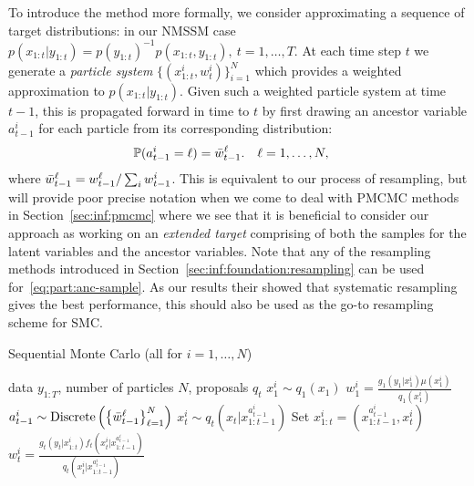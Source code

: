To introduce the \smc method more formally, we consider approximating a sequence of target distributions: in our NMSSM
 case $p(x_{1:t}|y_{1:t}) = p(y_{1:t})^{-1} p(x_{1:t},y_{1:t}), ~t=1,\ldots,T$. 
At each time step $t$ we 
generate a \emph{particle system}
$\{(x_{1:t}^i,w_{t}^i)\}_{i=1}^N$ which provides a weighted approximation  to $p(x_{1:t}|y_{1:t})$. Given such a weighted particle system at time $t-1$, this 
is propagated forward in time to $t$ by first drawing an ancestor variable $a_{t-1}^i$ for each particle from its corresponding distribution:
\begin{align}
\label{eq:part:anc-sample}
\mathbb{P}(a_{t-1}^i = \ell) &= \bar w_{t-1}^\ell.
&
\ell&=1,\ldots,N,
\end{align}
where $\bar w_{t-1}^\ell = w_{t-1}^\ell / \sum_i w_{t-1}^i$. This is equivalent to our process of resampling, but
will provide poor precise notation when we come to deal with PMCMC methods in Section~\ref{sec:inf:pmcmc}
where we see that it is beneficial to consider our approach as working on an \emph{extended target} comprising
of both the samples for the latent variables and the ancestor variables.  Note that any of the resampling 
methods introduced in Section~\ref{sec:inf:foundation:resampling} can be used for~\eqref{eq:part:anc-sample}.  As
our results their showed that systematic resampling gives the best performance, this should also be used
as the go-to resampling scheme for SMC.

\begin{algorithm}[tb]
	\caption{Sequential Monte Carlo \hfill {\small (all for $i=1,\ldots,N$)}}
	\label{alg:part:smc}
	\begin{spacing}{1.2}
		\begin{algorithmic}[1]
			\renewcommand{\algorithmicrequire}{\textbf{Inputs:}}
			\renewcommand{\algorithmicensure}{\textbf{Outputs:}}				 
			\Require  data $y_{1:T}$, number of particles $N$, proposals $q_t$
			\State $x_1^i \sim q_1(x_1)$
			\State $w_1^i = \frac{g_1(y_1|x_1^i) \mu(x_1^i)}{q_1(x_1^i)}$
			\State $a_{t-1}^i \sim \operatorname*{Discrete}\left(\left\{\bar w_{t-1}^{\ell}\right\}_{\ell=1}^N\right)$%
			\State $x_t^i \sim q_t(x_t | x_{1:t-1}^{a_{t-1}^i})$ 
			\State Set $x_{1:t}^i = (x_{1:t-1}^{a_{t-1}^i},x_t^i)$
			\State $w_t^i = \frac{g_t(y_t|x_{1:t}^i) f_t(x_t^i | x_{1:t-1}^{a_{t-1}^i})}{q_t(x_t^i|x_{1:t-1}^{a_{t-1}^i})}$
			\EndFor
		\end{algorithmic}
	\end{spacing}
\end{algorithm}

